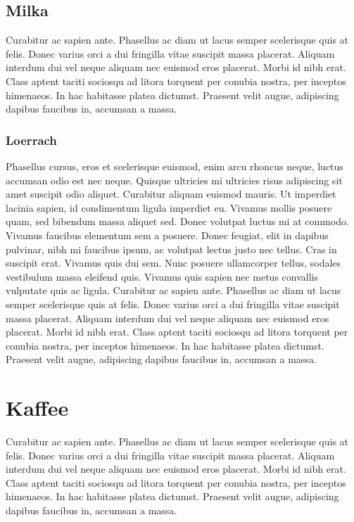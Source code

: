 \subsection{Milka}


Curabitur ac sapien ante. Phasellus ac diam ut lacus semper scelerisque quis at felis. Donec varius orci a dui fringilla vitae suscipit massa placerat. Aliquam interdum dui vel neque aliquam nec euismod eros placerat. Morbi id nibh erat. Class aptent taciti sociosqu ad litora torquent per conubia nostra, per inceptos himenaeos. In hac habitasse platea dictumst. Praesent velit augue, adipiscing dapibus faucibus in, accumsan a massa.
\subsubsection{Loerrach}
Phasellus cursus, eros et scelerisque euismod, enim arcu rhoncus neque, luctus accumsan odio est nec neque. Quisque ultricies mi ultricies risus adipiscing sit amet suscipit odio aliquet. Curabitur aliquam euismod mauris. Ut imperdiet lacinia sapien, id condimentum ligula imperdiet eu. Vivamus mollis posuere quam, sed bibendum massa aliquet sed. Donec volutpat luctus mi at commodo. Vivamus faucibus elementum sem a posuere. Donec feugiat, elit in dapibus pulvinar, nibh mi faucibus ipsum, ac volutpat lectus justo nec tellus. Cras in suscipit erat. Vivamus quis dui sem. Nunc posuere ullamcorper tellus, sodales vestibulum massa eleifend quis. Vivamus quis sapien nec metus convallis vulputate quis ac ligula. 
Curabitur ac sapien ante. Phasellus ac diam ut lacus semper scelerisque quis at felis. Donec varius orci a dui fringilla vitae suscipit massa placerat. Aliquam interdum dui vel neque aliquam nec euismod eros placerat. Morbi id nibh erat. Class aptent taciti sociosqu ad litora torquent per conubia nostra, per inceptos himenaeos. In hac habitasse platea dictumst. Praesent velit augue, adipiscing dapibus faucibus in, accumsan a massa.

\section{Kaffee}
Curabitur ac sapien ante. Phasellus ac diam ut lacus semper scelerisque quis at felis. Donec varius orci a dui fringilla vitae suscipit massa placerat. Aliquam interdum dui vel neque aliquam nec euismod eros placerat. Morbi id nibh erat. Class aptent taciti sociosqu ad litora torquent per conubia nostra, per inceptos himenaeos. In hac habitasse platea dictumst. Praesent velit augue, adipiscing dapibus faucibus in, accumsan a massa.

